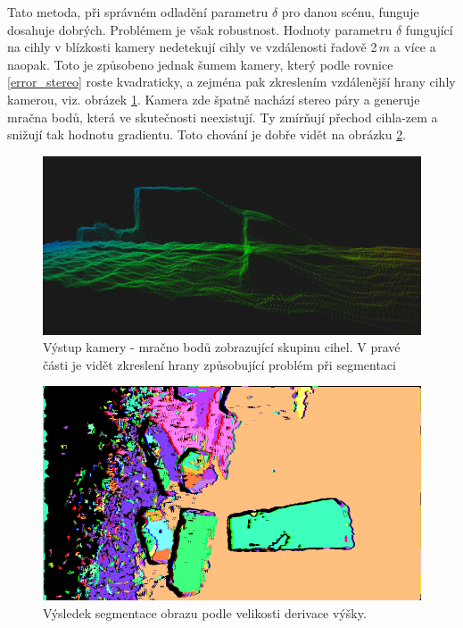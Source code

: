 \documentclass[twoside]{ctuthesis}
\begin{document}
Tato metoda, při správném odladění parametru $\delta$ pro danou scénu, funguje dosahuje dobrých. Problémem je však robustnost. Hodnoty parametru $\delta$ fungující na cihly v blízkosti kamery nedetekují cihly ve vzdálenosti řadově 2\,$m$ a více a naopak. Toto je způsobeno jednak šumem kamery, který podle rovnice \ref{error_stereo} roste kvadraticky, a zejména pak zkreslením vzdálenější hrany cihly kamerou, viz. obrázek \ref{fig:point_cloud_grad}. Kamera zde špatně nachází stereo páry a generuje mračna bodů, která ve skutečnosti neexistují. Ty zmírňují přechod cihla-zem a snižují tak hodnotu gradientu. Toto chování je dobře vidět na obrázku \ref{fig:sobel_segment}.
\begin{figure}
    \centering
    \includegraphics[width = \linewidth]{pictures/pc_crop.png}
    \caption{Výstup kamery - mračno bodů zobrazující skupinu cihel. V pravé části je vidět zkreslení hrany způsobující problém při segmentaci}
    \label{fig:point_cloud_grad}
\end{figure}

\begin{figure}
    \centering
    \includegraphics[width = \linewidth]{pictures/obr10_grad.png}
    \caption{Výsledek segmentace obrazu podle velikosti derivace výšky.}
    \label{fig:sobel_segment}
\end{figure}
\end{document}
